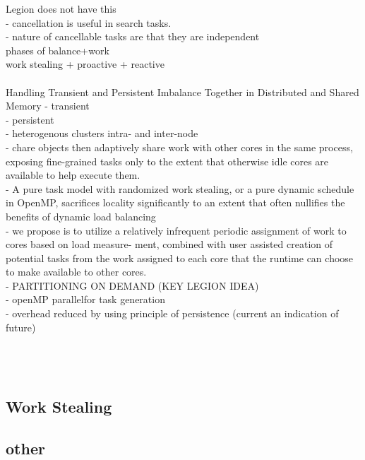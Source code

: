 \documentclass{article}
\begin{document}
Legion does not have this\\
	- cancellation is useful in search tasks.\\
	- nature of cancellable tasks are that they are independent\\

phases of balance+work\\
 work stealing + proactive + reactive\\

\cite{CCGrid2018}\\
Handling Transient and Persistent Imbalance Together in Distributed and Shared Memory
- transient \\
- persistent \\
- heterogenous clusters intra- and inter-node\\
- chare objects then adaptively share work with other cores in the same process,
  exposing fine-grained tasks only to the extent that otherwise idle cores are
available to help execute them.\\
- A pure task model with randomized work stealing, or a pure dynamic schedule in
  OpenMP, sacrifices locality significantly to an extent that often nullifies
the benefits of dynamic load balancing\\
- we propose is to utilize a relatively infrequent periodic assignment of work
  to cores based on load measure- ment, combined with user assisted creation of
potential tasks from the work assigned to each core that the runtime can choose
to make available to other cores.\\
- PARTITIONING ON DEMAND (KEY LEGION IDEA)\\
- openMP parallelfor task generation\\
- overhead reduced by using principle of persistence (current an indication of
  future)\\
\cite{8025281}\\
\cite{7307597}\\
\cite{Galvez:2017:ATM:3079079.3079104} \\%


\subsection{Work Stealing}
\cite{Yang2017}
\cite{Chen:2015:LWS:2775085.2766450}
\cite{Blumofe:1999:SMC:324133.324234}
\cite{Cilk}
\cite{Saraswat:2011:LGL:1941553.1941582}
\cite{Mitzenmacher:1998:ALS:277651.277687}

\subsection{other}
\end{document}
